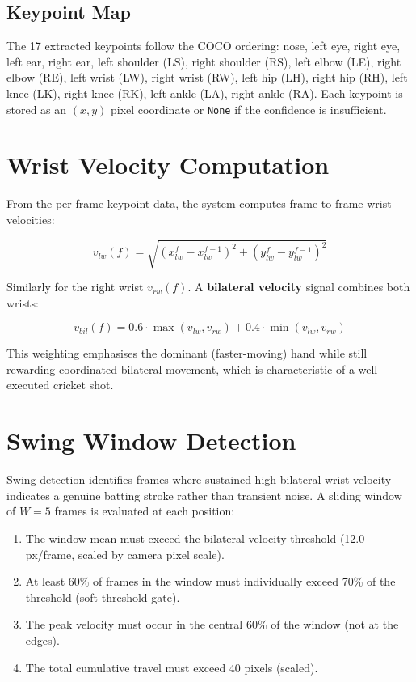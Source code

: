 \begin{justify}
\subsection{Keypoint Map}

\par The 17 extracted keypoints follow the COCO ordering: nose, left eye, right eye, left ear, right ear, left shoulder (LS), right shoulder (RS), left elbow (LE), right elbow (RE), left wrist (LW), right wrist (RW), left hip (LH), right hip (RH), left knee (LK), right knee (RK), left ankle (LA), right ankle (RA). Each keypoint is stored as an $(x, y)$ pixel coordinate or \texttt{None} if the confidence is insufficient.

\section{Wrist Velocity Computation}

\par From the per-frame keypoint data, the system computes frame-to-frame wrist velocities:

\begin{equation}
    v_{lw}(f) = \sqrt{(x_{lw}^{f} - x_{lw}^{f-1})^2 + (y_{lw}^{f} - y_{lw}^{f-1})^2}
\end{equation}

\par Similarly for the right wrist $v_{rw}(f)$. A \textbf{bilateral velocity} signal combines both wrists:

\begin{equation}
    v_{bil}(f) = 0.6 \cdot \max(v_{lw}, v_{rw}) + 0.4 \cdot \min(v_{lw}, v_{rw})
\end{equation}

\par This weighting emphasises the dominant (faster-moving) hand while still rewarding coordinated bilateral movement, which is characteristic of a well-executed cricket shot.

\section{Swing Window Detection}

\par Swing detection identifies frames where sustained high bilateral wrist velocity indicates a genuine batting stroke rather than transient noise. A sliding window of $W = 5$ frames is evaluated at each position:

\begin{enumerate}
    \item The window mean must exceed the bilateral velocity threshold (12.0 px/frame, scaled by camera pixel scale).
    \item At least 60\% of frames in the window must individually exceed 70\% of the threshold (soft threshold gate).
    \item The peak velocity must occur in the central 60\% of the window (not at the edges).
    \item The total cumulative travel must exceed 40 pixels (scaled).
\end{enumerate}


\end{justify}
